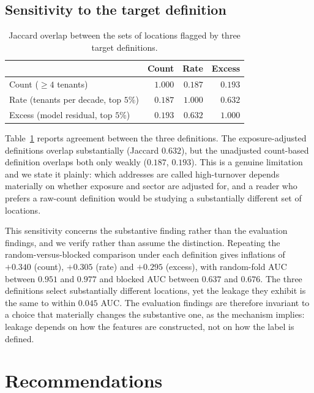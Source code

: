 \documentclass[11pt]{article}
\begin{document}
\subsection{Sensitivity to the target definition}

\begin{table}[t]
\centering
\begin{tabular}{lrrr}
\toprule
 & Count & Rate & Excess \\
\midrule
Count ($\geq 4$ tenants)        & $1.000$ & $0.187$ & $0.193$ \\
Rate (tenants per decade, top $5\%$) & $0.187$ & $1.000$ & $0.632$ \\
Excess (model residual, top $5\%$)   & $0.193$ & $0.632$ & $1.000$ \\
\bottomrule
\end{tabular}
\caption{Jaccard overlap between the sets of locations flagged by three target
definitions.}
\label{tab:definitions}
\end{table}

Table~\ref{tab:definitions} reports agreement between the three definitions.
The exposure-adjusted definitions overlap substantially (Jaccard $0.632$), but
the unadjusted count-based definition overlaps both only weakly ($0.187$,
$0.193$). This is a genuine limitation and we state it plainly: which addresses
are called high-turnover depends materially on whether exposure and sector are
adjusted for, and a reader who prefers a raw-count definition would be studying
a substantially different set of locations.

This sensitivity concerns the substantive finding rather than the evaluation
findings, and we verify rather than assume the distinction. Repeating the
random-versus-blocked comparison under each definition gives inflations of
$+0.340$ (count), $+0.305$ (rate) and $+0.295$ (excess), with random-fold AUC
between $0.951$ and $0.977$ and blocked AUC between $0.637$ and $0.676$. The
three definitions select substantially different locations, yet the leakage they
exhibit is the same to within $0.045$ AUC. The evaluation findings are therefore
invariant to a choice that materially changes the substantive one, as the
mechanism implies: leakage depends on how the features are constructed, not on
how the label is defined.

\section{Recommendations}
\end{document}

